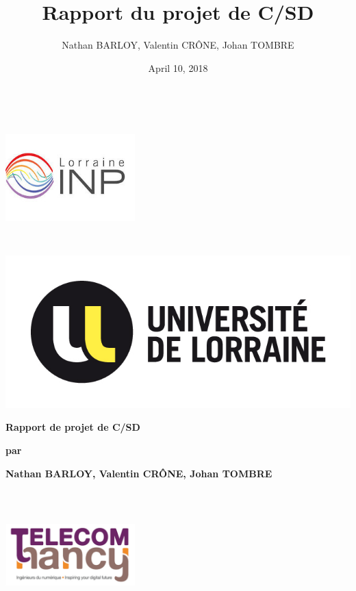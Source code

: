 \documentclass{report}
\title{Rapport du projet de C/SD}
\author{Nathan BARLOY, Valentin CRÔNE, Johan TOMBRE}
\date{April 10, 2018}
\begin{document}
\begin{titlepage}
\centering
        \begin{flushleft}\hspace{1cm}
\begin{flushleft}\includegraphics[keepaspectratio, width=5cm,height=5cm]{img/Logoinp.jpg}\end{flushleft}
        \end{flushleft}
        \vspace*{-4cm}
        \begin{flushright}
        \includegraphics{img/Logouniv.jpg}
        \end{flushright}
        \vspace*{1cm}
        \vspace*{1cm}
        {\LARGE \bfseries Rapport de projet de C/SD \par}
        \vspace*{0.5cm}
        {\LARGE \bfseries par\par}
        \vspace*{0.5cm}
        {\LARGE \bfseries Nathan BARLOY, Valentin CRÔNE, Johan TOMBRE\par}
        \vfill
        \begin{flushright}
\begin{flushright}\includegraphics[keepaspectratio, width=5cm,height=5cm]{img/LogoTelecom.png}\end{flushright}

\end{flushright}
\end{titlepage}
\end{document}
